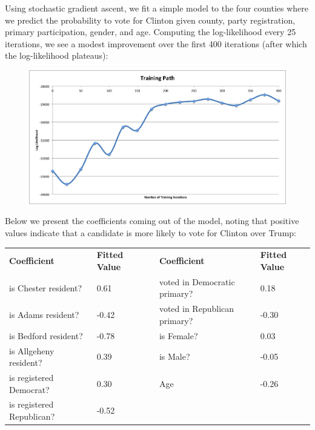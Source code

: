 \documentclass[10pt, letterpaper]{article}
\begin{document}
Using stochastic gradient ascent, we fit a simple model to the four counties where we predict the probability to vote for Clinton given county, party registration, primary participation, gender, and age. Computing the log-likelihood every 25 iterations, we see a modest improvement over the first 400 iterations (after which the log-likelihood plateaus): 
\begin{figure}[H]
\centering
\includegraphics[scale = 0.4]{TrainingPath}
\end{figure}

Below we present the coefficients coming out of the model, noting that positive values indicate that a candidate is more likely to vote for Clinton over Trump:

\begin{table}[H]
\centering
\label{my-label}
\begin{tabular}{|l|l|l|l|l|}
\cline{1-2} \cline{4-5}
\textbf{Coefficient}      & \textbf{Fitted Value} &  & \textbf{Coefficient}         & \textbf{Fitted Value} \\ \cline{1-2} \cline{4-5} 
is Chester resident?      & 0.61                  &  & voted in Democratic primary? & 0.18                  \\ \cline{1-2} \cline{4-5} 
is Adams resident?        & -0.42                 &  & voted in Republican primary? & -0.30                 \\ \cline{1-2} \cline{4-5} 
is Bedford resident?      & -0.78                 &  & is Female?                   & 0.03                  \\ \cline{1-2} \cline{4-5} 
is Allgeheny resident?    & 0.39                  &  & is Male?                     & -0.05                 \\ \cline{1-2} \cline{4-5} 
is registered Democrat?   & 0.30                  &  & Age                          & -0.26                 \\ \cline{1-2} \cline{4-5} 
is registered Republican? & -0.52                 &  &                              &                       \\ \cline{1-2} \cline{4-5} 
\end{tabular}
\end{table}
\end{document}
